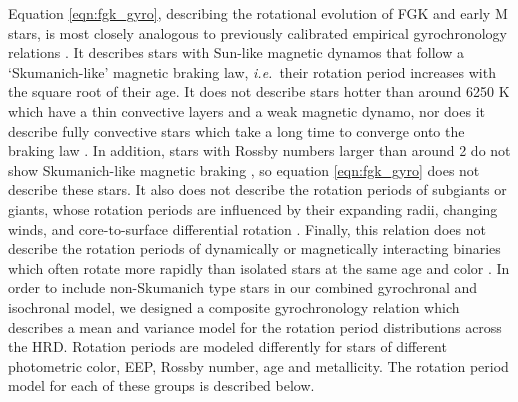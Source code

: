 \documentclass[useAMS, usenatbib, preprint, 12pt]{aastex}
\newcommand{\ie}{{\it i.e.}}
\newcommand{\eg}{{\it e.g.}}
\begin{document}
Equation \ref{eqn:fgk_gyro}, describing the rotational evolution of FGK and
early M stars, is most closely analogous to previously calibrated empirical
gyrochronology relations \citep[\eg][]{barnes2003, barnes2007, mamajek2008,
barnes2010, angus2015}.
It describes stars with Sun-like magnetic dynamos that follow a
`Skumanich-like' magnetic braking law, \ie\ their rotation period increases
with the square root of their age.
It does not describe stars hotter than around 6250 K which have a thin
convective layers and a weak magnetic dynamo, nor does it describe fully
convective stars which take a long time to converge onto the
\citet{skumanich1972} braking law \citep{krishnamurthi1997}.
In addition, stars with Rossby numbers larger than around 2 do not show
Skumanich-like magnetic braking \citep{vansaders2016, vansaders2018}, so
equation \ref{eqn:fgk_gyro} does not describe these stars.
It also does not describe the rotation periods of subgiants or giants, whose
rotation periods are influenced by their expanding radii, changing winds, and
core-to-surface differential rotation \citep[\eg][]{vansaders2013, tayar2018}.
Finally, this relation does not describe the rotation periods of dynamically
or magnetically interacting binaries which often rotate more rapidly than
isolated stars at the same age and color \citep{douglas2016}.
In order to include non-Skumanich type stars in our combined gyrochronal and
isochronal model, we designed a composite gyrochronology relation which
describes a mean and variance model for the rotation period distributions
across the HRD.
Rotation periods are modeled differently for stars of different photometric
color, EEP, Rossby number, age and metallicity.
The rotation period model for each of these groups is described below.
\end{document}
